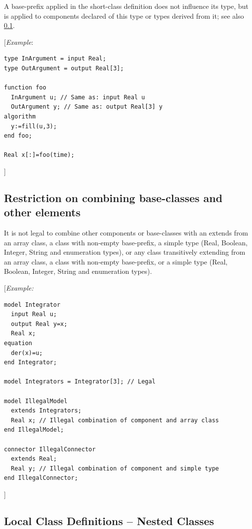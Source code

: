 \documentclass[10pt,a4paper]{report}
\def\doublelabel#1{\label{#1}}
\begin{document}
A base-prefix applied in the short-class definition does not influence
its type, but is applied to components declared of this type or types
derived from it; see also \ref{restriction-on-combining-base-classes-and-other-elements}.

{[}\emph{Example}:
\begin{lstlisting}[language=modelica]
type InArgument = input Real;
type OutArgument = output Real[3];

function foo
  InArgument u; // Same as: input Real u
  OutArgument y; // Same as: output Real[3] y
algorithm
  y:=fill(u,3);
end foo;

Real x[:]=foo(time);
\end{lstlisting}

{]}

\subsection{Restriction on combining base-classes and other elements}\doublelabel{restriction-on-combining-base-classes-and-other-elements}

It is not legal to combine other components or base-classes with an
extends from an array class, a class with non-empty base-prefix, a
simple type (Real, Boolean, Integer, String and enumeration types), or
any class transitively extending from an array class, a class with
non-empty base-prefix, or a simple type (Real, Boolean, Integer, String
and enumeration types).

{[}\emph{Example:}
\begin{lstlisting}[language=modelica]
model Integrator
  input Real u;
  output Real y=x;
  Real x;
equation
  der(x)=u;
end Integrator;

model Integrators = Integrator[3]; // Legal

model IllegalModel
  extends Integrators;
  Real x; // Illegal combination of component and array class 
end IllegalModel;

connector IllegalConnector
  extends Real;
  Real y; // Illegal combination of component and simple type
end IllegalConnector;
\end{lstlisting}

{]}

\subsection{Local Class Definitions -- Nested Classes}\doublelabel{local-class-definitions-nested-classes}
\end{document}
